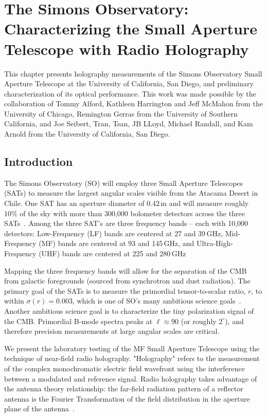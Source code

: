 \chapter{The Simons Observatory: Characterizing the Small Aperture Telescope with Radio Holography}
\label{ch:sat_holo}
This chapter presents holography measurements of the Simons Observatory Small Aperture Telescope at the University of California, San Diego, and preliminary characterization of its optical performance.  This work was made possible by the collaboration of Tommy Alford, Kathleen Harrington and Jeff McMahon from the University of Chicago, Remington Gerras from the University of Southern California, and Joe Seibert, Tran, Tsan, JB LLoyd, Michael Randall, and Kam Arnold from the University of California, San Diego.

\section{Introduction}
The Simons Observatory (SO) will employ three Small Aperture Telescopes (SATs) to measure the largest angular scales visible from the Atacama Desert in Chile.  One SAT has an aperture diameter of 0.42\,m and will measure roughly 10\% of the sky with more than 300,000 bolometer detectors across the three SATs~\cite{2020SPIE11445E7LK}.  Among the three SAT's are three frequency bands -- each with 10,000 detectors: Low-Frequency (LF) bands are centered at 27 and 39\,GHz, Mid-Frequency (MF) bands are centered at 93 and 145\,GHz, and Ultra-High-Frequency (UHF) bands are centered at 225 and 280\,GHz

Mapping the three frequency bands will allow for the separation of the CMB from galactic foregrounds (sourced from synchrotron and dust radiation).  The primary goal of the SATs is to measure the primordial tensor-to-scalar ratio, $r$, to within $\sigma(r) = 0.003$, which is one of SO's many ambitious science goals~\cite{ali20}.  Another ambitious science goal is to characterize the tiny polarization signal of the CMB.  Primordial B-mode spectra peaks at $\ell\approx90$ (or roughly $2^{\circ}$), and therefore precision measurements at large angular scales are critical.

We present the laboratory testing of the MF Small Aperture Telescope using the technique of near-field radio holography.  "Holography" refers to the measurement of the complex monochromatic electric field wavefront using the interference between a modulated and reference signal.  Radio holography takes advantage of the antenna theory relationship: the far-field radiation pattern of a reflector antenna is the Fourier Transformation of the field distribution in the aperture plane of the antenna~\cite{alma_holog}.

